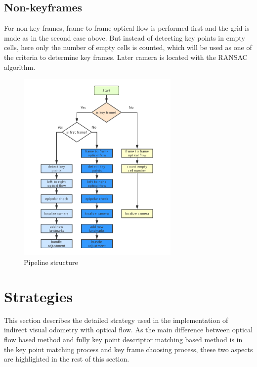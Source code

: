 \documentclass{easychair}
\begin{document}
\subsection{Non-keyframes}
For non-key frames, frame to frame optical flow is performed first and the grid is made as in the second case above. But instead of detecting key points in empty cells, here only the number of empty cells is counted, which will be used as one of the criteria to determine key frames. Later camera is located with the RANSAC algorithm.

\begin{figure}[h!]
	\centering
	\includegraphics[width=0.7\textwidth]{img/flowchart.png}
	\caption{Pipeline structure}
	\label{fig:pipeline structure}
\end{figure}



\section{Strategies}
This section describes the detailed strategy used in the implementation of indirect visual odometry with optical flow. As the main difference between optical flow based method and fully key point descriptor matching based method is in the key point matching process and key frame choosing process, these two aspects are highlighted in the rest of this section.

\end{document}
